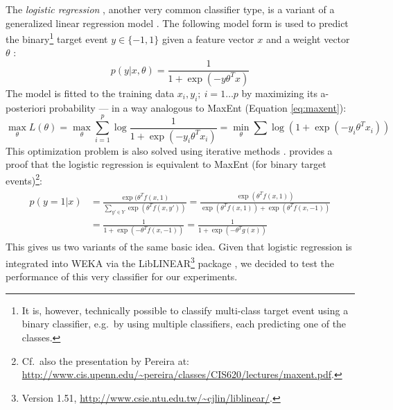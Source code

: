 \documentclass[12pt,notitlepage,a4paper]{report}
\begin{document}
The \emph{logistic regression} \citep{hosmer00}, another very common classifier type, is a variant of a generalized linear regression model \citep{maccullagh91}. The following model form is used to predict the binary\footnote{It is, however, technically possible to classify multi-class target event using a binary classifier, e.g.\ by using multiple classifiers, each predicting one of the classes.} target event $y \in\{-1,1\}$ given a feature vector $x$ and a weight vector $\theta$ \citep{lee06}:
\begin{equation}
p(y|x,\theta) = \frac{1}{1 + \exp(-y\theta^T x)}
\end{equation}
The model is fitted to the training data $x_i,y_i;\ i = 1\dots p$ by maximizing its a-posteriori probability --- in a way analogous to MaxEnt (Equation \ref{eq:maxent}):
\begin{equation}\label{eq:logreg}
\max_\theta L(\theta) = \max_\theta \sum_{i=1}^p \log \frac{1}{1 + \exp(-y_i\theta^T x_i)} = \min_\theta \sum\log(1 + \exp(-y_i\theta^T x_i))
\end{equation}
This optimization problem is also solved using iterative methods \citep{fan08}. \citet{blower04} provides a proof that the logistic regression is equivalent to MaxEnt (for binary target events)\footnote{Cf.\ also the presentation by Pereira at:\\ \url{http://www.cis.upenn.edu/\~pereira/classes/CIS620/lectures/maxent.pdf}.}:
\begin{align}
\begin{split}
p(y=1|x) & = \frac{\exp(\theta^T f(x,1)}{\sum_{y'\in Y} \exp(\theta^T f(x,y'))} = \frac{\exp(\theta^T f(x,1))}{\exp(\theta^T f(x,1)) + \exp(\theta^T f(x,-1))} \\
& = \frac{1}{1 + \exp(-\theta^T f(x,-1))} = \frac{1}{1 + \exp(-\theta^T g(x))}
\end{split}
\end{align}
This gives us two variants of the same basic idea. Given that logistic regression is integrated into WEKA via the LibLINEAR\footnote{Version 1.51, \url{http://www.csie.ntu.edu.tw/\~cjlin/liblinear/}.} package \citep{fan08}, we decided to test the performance of this very classifier for our experiments.
\end{document}
